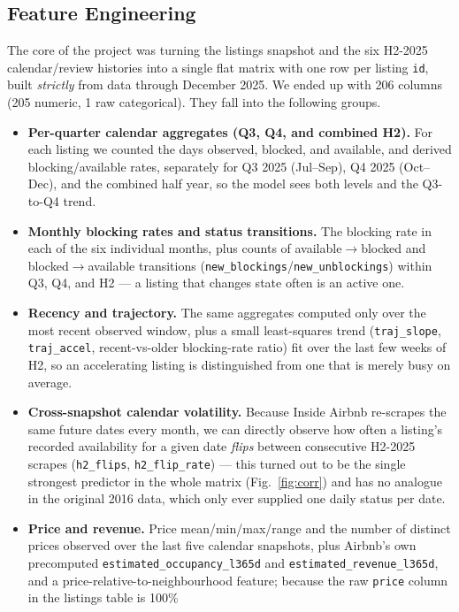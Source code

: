 \documentclass[journal]{IEEEtran}
\begin{document}
\subsection{Feature Engineering}
\label{sec:featuregroups}
The core of the project was turning the listings snapshot and the six H2-2025
calendar/review histories into a single flat matrix with one row per listing
\texttt{id}, built \emph{strictly} from data through December 2025. We ended up
with 206 columns (205 numeric, 1 raw categorical). They fall into the following
groups.
\begin{itemize}
\item \textbf{Per-quarter calendar aggregates (Q3, Q4, and combined H2).} For
each listing we counted the days observed, blocked, and available, and derived
blocking/available rates, separately for Q3 2025 (Jul--Sep), Q4 2025 (Oct--Dec),
and the combined half year, so the model sees both levels and the Q3-to-Q4
trend.
\item \textbf{Monthly blocking rates and status transitions.} The blocking rate
in each of the six individual months, plus counts of available$\to$blocked and
blocked$\to$available transitions (\texttt{new\_blockings}/\texttt{new\_unblockings})
within Q3, Q4, and H2 --- a listing that changes state often is an active one.
\item \textbf{Recency and trajectory.} The same aggregates computed only over
the most recent observed window, plus a small least-squares trend
(\texttt{traj\_slope}, \texttt{traj\_accel}, recent-vs-older blocking-rate ratio)
fit over the last few weeks of H2, so an accelerating listing is distinguished
from one that is merely busy on average.
\item \textbf{Cross-snapshot calendar volatility.} Because Inside Airbnb
re-scrapes the same future dates every month, we can directly observe how often
a listing's recorded availability for a given date \emph{flips} between
consecutive H2-2025 scrapes (\texttt{h2\_flips}, \texttt{h2\_flip\_rate}) ---
this turned out to be the single strongest predictor in the whole matrix
(Fig.~\ref{fig:corr}) and has no analogue in the original 2016 data, which only
ever supplied one daily status per date.
\item \textbf{Price and revenue.} Price mean/min/max/range and the number of
distinct prices observed over the last five calendar snapshots, plus Airbnb's
own precomputed \texttt{estimated\_occupancy\_l365d} and
\texttt{estimated\_revenue\_l365d}, and a price-relative-to-neighbourhood
feature; because the raw \texttt{price} column in the listings table is 100\%

\end{itemize}
\end{document}

